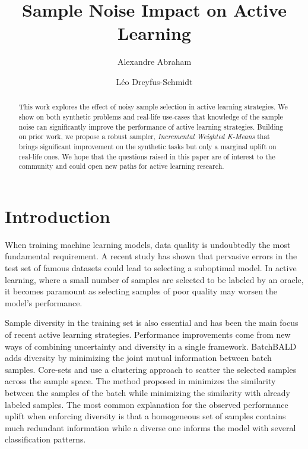 \documentclass[runningheads]{llncs}
\begin{document}
\title{Sample Noise Impact on Active Learning}

\author{Alexandre Abraham\\ \and
 Léo Dreyfus-Schmidt}




\maketitle

\begin{abstract}
  This work explores the effect of noisy sample selection in active learning strategies.
  We show on both synthetic problems and real-life use-cases that knowledge of the sample noise can significantly improve the performance of active learning strategies. Building on prior work, we propose a robust sampler, \textit{Incremental Weighted K-Means} that brings significant improvement on the synthetic tasks but only a marginal uplift on real-life ones.
  We hope that the questions raised in this paper are of interest to the community and could
  open new paths for active learning research.

\end{abstract}

\section{Introduction}
When training machine learning models, data quality is undoubtedly the most fundamental
requirement.  A recent study \cite{northcutt2021pervasive} has shown that pervasive
errors in the test set of famous datasets could lead to selecting a suboptimal model.
In active learning, where a small number of samples are selected to be 
labeled by an oracle, it becomes paramount as selecting samples of poor quality 
may worsen the model's performance.

Sample diversity in the training set is also essential and has been the main focus of
recent active learning strategies. 
Performance improvements come from new ways of combining uncertainty and diversity in
a single framework. BatchBALD \cite{kirsch2019batchbald} adds diversity by minimizing the joint mutual information between 
batch samples. Core-sets \cite{sener2017active} and \cite{zhdanov2019diverse}
use a clustering approach to scatter the selected samples across the sample space. The method
proposed in \cite{du2015exploring} minimizes the similarity between the samples of the batch
while minimizing the similarity with already labeled samples. The most common explanation 
for the observed performance uplift when enforcing diversity is that a homogeneous set of samples contains
much redundant information while a diverse one informs the model with several
classification patterns.
\end{document}
